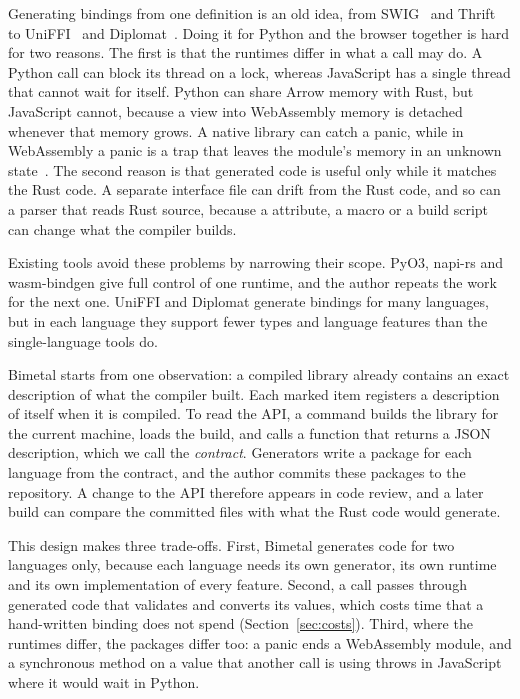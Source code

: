 \documentclass[sigconf,nonacm]{acmart}
\begin{document}
Generating bindings from one definition is an old idea, from SWIG~\cite{beazley1996swig} and Thrift~\cite{slee2007thrift} to UniFFI~\cite{uniffi} and Diplomat~\cite{diplomat}. Doing it for Python and the browser together is hard for two reasons. The first is that the runtimes differ in what a call may do. A Python call can block its thread on a lock, whereas JavaScript has a single thread that cannot wait for itself. Python can share Arrow memory with Rust, but JavaScript cannot, because a view into WebAssembly memory is detached whenever that memory grows. A native library can catch a panic, while in WebAssembly a panic is a trap that leaves the module's memory in an unknown state~\cite{haas2017wasm}. The second reason is that generated code is useful only while it matches the Rust code. A separate interface file can drift from the Rust code, and so can a parser that reads Rust source, because a  attribute, a macro or a build script can change what the compiler builds.

Existing tools avoid these problems by narrowing their scope. PyO3, napi-rs and wasm-bindgen give full control of one runtime, and the author repeats the work for the next one. UniFFI and Diplomat generate bindings for many languages, but in each language they support fewer types and language features than the single-language tools do.

Bimetal starts from one observation: a compiled library already contains an exact description of what the compiler built. Each marked item registers a description of itself when it is compiled. To read the API, a command builds the library for the current machine, loads the build, and calls a function that returns a JSON description, which we call the \emph{contract}. Generators write a package for each language from the contract, and the author commits these packages to the repository. A change to the API therefore appears in code review, and a later build can compare the committed files with what the Rust code would generate.

This design makes three trade-offs. First, Bimetal generates code for two languages only, because each language needs its own generator, its own runtime and its own implementation of every feature. Second, a call passes through generated code that validates and converts its values, which costs time that a hand-written binding does not spend (Section~\ref{sec:costs}). Third, where the runtimes differ, the packages differ too: a panic ends a WebAssembly module, and a synchronous method on a value that another call is using throws in JavaScript where it would wait in Python.
\end{document}
